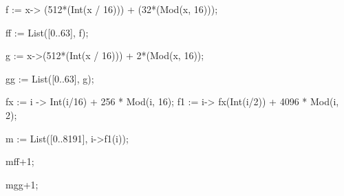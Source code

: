f :=  x-> (512*(Int(x / 16))) + (32*(Mod(x, 16)));

ff := List([0..63], f);

g := x->(512*(Int(x / 16))) + 2*(Mod(x, 16));

gg := List([0..63], g);

fx := i -> Int(i/16) + 256 * Mod(i, 16);
f1 := i-> fx(Int(i/2)) + 4096 * Mod(i, 2);

m := List([0..8191], i->f1(i));


m{ff+1};

m{gg+1};
